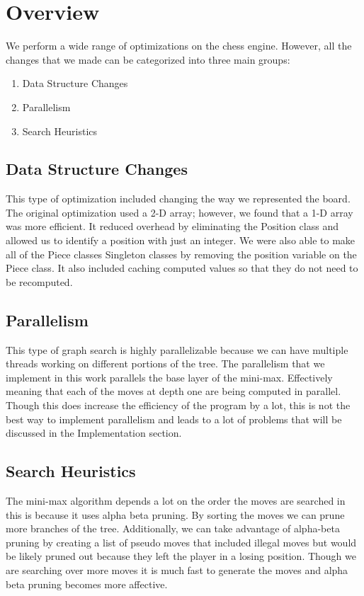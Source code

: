 \documentclass[sigconf]{acmart}
\begin{document}
\section{Overview}
We perform a wide range of optimizations on the chess engine.
However, all the changes that we made can be categorized into three main groups:
\begin{enumerate}
    \item Data Structure Changes
    \item Parallelism
    \item Search Heuristics
\end{enumerate}

\subsection{Data Structure Changes}
This type of optimization included changing the way we represented the board.
The original optimization used a 2-D array; however, we found that a 1-D array was more efficient.
It reduced overhead by eliminating the Position class and allowed us to identify a position with just an integer.
We were also able to make all of the Piece classes Singleton classes by removing the position variable on the Piece class.
It also included caching computed values so that they do not need to be recomputed.

\subsection{Parallelism}
This type of graph search is highly parallelizable because we can have multiple threads working on different portions of the tree.
The parallelism that we implement in this work parallels the base layer of the mini-max.
Effectively meaning that each of the moves at depth one are being computed in parallel.
Though this does increase the efficiency of the program by a lot, this is not the best way to implement parallelism and leads to a lot of problems that will be discussed in the Implementation section.

\subsection{Search Heuristics}
The mini-max algorithm depends a lot on the order the moves are searched in this is because it uses alpha beta pruning.
By sorting the moves we can prune more branches of the tree.
Additionally, we can take advantage of alpha-beta pruning by creating a list of pseudo moves that included illegal moves but would be likely pruned out because they left the player in a losing position.
Though we are searching over more moves it is much fast to generate the moves and alpha beta pruning becomes more affective.
\end{document}
